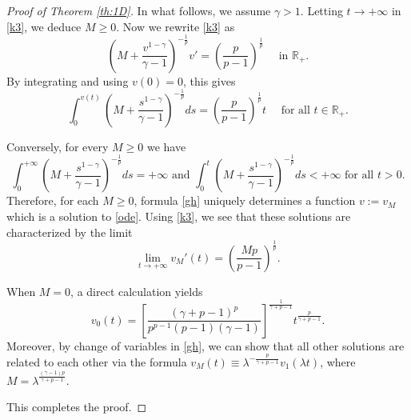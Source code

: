 \documentclass[reqno]{amsart}
\theoremstyle{plain}
\theoremstyle{definition}
\theoremstyle{remark}
\begin{document}
\begin{proof}[Proof of Theorem \ref{th:1D}]
		In what follows, we assume $\gamma>1$. Letting $t\to+\infty$ in \eqref{k3}, we deduce $M\ge0$. Now we rewrite \eqref{k3} as
		\[
		\left(M + \frac{v^{1-\gamma}}{\gamma-1}\right)^{-\frac{1}{p}} v' = \left(\frac{p}{p-1}\right)^\frac{1}{p} \quad\text{ in } \mathbb{R}_+.
		\]
		By integrating and using $v(0)=0$, this gives
		\begin{equation}\label{gh}
			\int_{0}^{v(t)} \left(M + \frac{s^{1-\gamma}}{\gamma-1}\right)^{-\frac{1}{p}} ds = \left(\frac{p}{p-1}\right)^\frac{1}{p}t \quad\text{ for all } t\in\mathbb{R}_+.
		\end{equation}
		
		Conversely, for every $M\ge0$ we have
		\[
		\int_{0}^{+\infty} \left(M + \frac{s^{1-\gamma}}{\gamma-1}\right)^{-\frac{1}{p}} ds = +\infty \text{ and }
		\int_{0}^{t} \left(M + \frac{s^{1-\gamma}}{\gamma-1}\right)^{-\frac{1}{p}} ds < +\infty \text{ for all } t>0.
		\]
		Therefore, for each $M\ge0$, formula \eqref{gh} uniquely determines a function $v:=v_M$ which is a solution to \eqref{ode}. Using \eqref{k3}, we see that these solutions are characterized by the limit
		\[
		\lim_{t\to+\infty} v_M'(t) = \left(\frac{Mp}{p-1}\right)^\frac{1}{p}.
		\]
		
		When $M=0$, a direct calculation yields
		\[
		v_0(t) = \left[\frac{(\gamma+p-1)^p}{p^{p-1}(p-1)(\gamma-1)}\right]^\frac{1}{\gamma+p-1}	t^\frac{p}{\gamma+p-1}.
		\]		
		Moreover, by change of variables in \eqref{gh}, we can show that all other solutions are related to each other via the formula $v_M(t) \equiv \lambda^{-\frac{p}{\gamma+p-1}} v_1(\lambda t)$, where $M=\lambda^\frac{(\gamma-1)p}{\gamma+p-1}$.
		
		This completes the proof.
	\end{proof}
	
\end{document}

